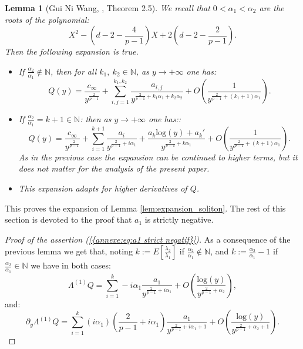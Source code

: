 \documentclass[11pt,a4paper,reqno]{amsart}
\newtheorem{lemma}[theorem]{Lemma}
\theoremstyle{remark}
\numberwithin{equation}{section}
\begin{document}
\begin{appendix}
\begin{lemma}[Gui Ni Wang, \cite{GNW}, Theorem 2.5]
We recall that $0<\alpha_1<\alpha_2$ are the roots of the polynomial:
\begin{equation}
X^2-\left(d-2-\frac{4}{p-1}\right)X+2\left(d-2-\frac{2}{p-1}\right) .
\end{equation}
Then the following expansion is true.
\begin{itemize}
\item[(i)] \emph{If $\frac{\alpha_2}{\alpha_1}\notin \mathbb{N}$}, then for all $k_1, \ k_2 \in \mathbb{N}$, as $y\rightarrow +\infty$ one has:
\begin{equation}
Q(y)=\frac{c_{\infty}}{y^{\frac{2}{p-1}}}+\sum_{i,j=1}^{k_1,k_2}\frac{a_{i,j}}{y^{\frac{2}{p-1}+k_1\alpha_1+k_2\alpha_2}}+O\left(\frac{1}{y^{\frac{2}{p-1}+(k_1+1)\alpha_1}} \right) .
\end{equation}
\item[(ii)] \emph{If $\frac{\alpha_2}{\alpha_1}=k+1\in \mathbb{N}$:} then as $y\rightarrow +\infty$ one has::
\begin{equation}
Q(y)=\frac{c_{\infty}}{y^{\frac{2}{p-1}}}+\sum_{i=1}^{k+1}\frac{a_i}{y^{\frac{2}{p-1}+i\alpha_1}}+\frac{a_k \text{log}(y)+a_k'}{y^{\frac{2}{p-1}+k\alpha_1}}+O \left( \frac{1}{y^{\frac{2}{p-1}+(k+1)\alpha_1}} \right).
\end{equation}
As in the previous case the expansion can be continued to higher terms, but it does not matter for the analysis of the present paper.
\item[(iii)] This expansion adapts for higher derivatives of $Q$.
\end{itemize}
\end{lemma}

This proves the expansion of Lemma \ref{lem:expansion_soliton}. The rest of this section is devoted to the proof that $a_1$ is strictly negative.

\begin{proof}[Proof of the assertion {{\rm (\ref{{annexe:eq:a1 strict negatif}})}}]
As a consequence of the previous lemma we get that, noting $k:=E[\frac{\lambda_2}{\lambda_1}]$ if $\frac{\alpha_2}{\alpha_1}\notin \mathbb{N}$, and $k:=\frac{\alpha_2}{\alpha_1}-1$ if $\frac{\alpha_2}{\alpha_1}\in \mathbb{N}$ we have in both cases:
\begin{equation}\label{eq:expansionlambdaQ}
\Lambda^{(1)}Q= \sum_{i=1}^{k}-i\alpha_1 \frac{a_1}{y^{\frac{2}{p-1}+i\alpha_1}}+O\left( \frac{\text{log}(y)}{y^{\frac{2}{p-1}+\alpha_2}}\right) ,
\end{equation}
and:
\begin{equation}\label{eq:expansion_nablalambdaQ}
\partial_y \Lambda^{(1)} Q= \sum_{i=1}^{k}(i\alpha_1)\left(\frac{2}{p-1}+i\alpha_1\right) \frac{a_1}{y^{\frac{2}{p-1}+i\alpha_1+1}}+O\left( \frac{\text{log}(y)}{y^{\frac{2}{p-1}+\alpha_2+1}}\right) .
\end{equation}


\end{proof}
\end{appendix}
\end{document}
